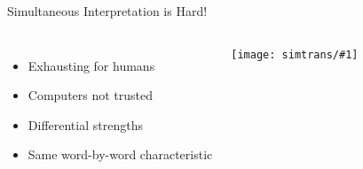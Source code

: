 \documentclass[compress]{beamer}
\newcommand{\fsi}[2]{
\begin{frame}[plain]
\vspace*{-1pt}
\makebox[\linewidth]{\texttt{[image: \#1]}}
\begin{center}
#2
\end{center}
\end{frame}
}
\newcommand{\gfxs}[2]{
\begin{center}
	\texttt{[image: simtrans/\#1]}
\end{center}
}
\begin{document}
\begin{frame}{Simultaneous Interpretation is Hard!}

  \begin{columns}
  \begin{itemize}
    \item Exhausting for humans
    \item Computers not trusted
    \item Differential strengths
    \item Same word-by-word characteristic
  \end{itemize}

 \gfxs{computer-interpreter}{1.0}
 \end{columns}
\end{frame}

\fsi{simtrans/liang_huang}{}
\fsi{simtrans/delay}{}
\end{document}
